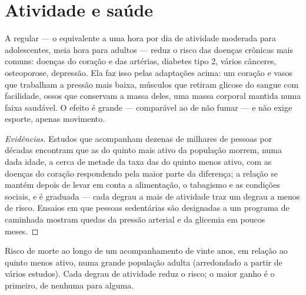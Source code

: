 \section{Atividade e saúde}

\begin{proposition}\label{prop:g10:sport-and-health:health}
A  regular --- o equivalente a uma hora por dia de
atividade moderada para adolescentes, meia hora para adultos --- reduz
o risco das doenças crônicas mais comuns: doenças do coração e das
artérias, diabetes tipo 2, vários cânceres, osteoporose, depressão. Ela
faz isso pelas adaptações acima: um coração e vasos que trabalham a
pressão mais baixa, músculos que retiram glicose do sangue com
facilidade, ossos que conservam a massa deles, uma massa corporal
mantida numa faixa saudável. O efeito é grande --- comparável ao de não
fumar --- e não exige esporte, apenas movimento.
\end{proposition}
\begin{proof}[Evidências]
Estudos que acompanham dezenas de milhares de pessoas por décadas
encontram que as do quinto mais ativo da população morrem, numa dada
idade, a cerca de metade da taxa das do quinto menos ativo, com as
doenças do coração respondendo pela maior parte da diferença; a relação
se mantém depois de levar em conta a alimentação, o tabagismo e as
condições sociais, e é graduada --- cada degrau a mais de atividade traz
um degrau a menos de risco. Ensaios em que pessoas sedentárias são
designadas a um programa de caminhada mostram quedas da pressão
arterial e da glicemia em poucos meses.
\end{proof}

\begin{omfigure}

{\small Risco de morte ao longo de um acompanhamento de vinte anos, em
relação ao quinto menos ativo, numa grande população adulta
(arredondado a partir de vários estudos). Cada degrau de atividade
reduz o risco; o maior ganho é o primeiro, de nenhuma para alguma.}
\end{omfigure}

